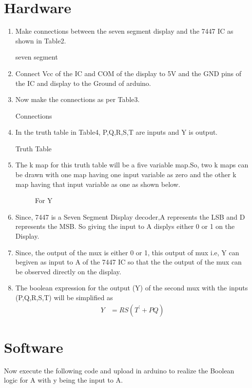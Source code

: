\documentclass[journal,twocolumn,10pt, a4paper]{article}
\begin{document}
\section{Hardware}
\begin{enumerate}
\item Make connections between the seven segment display and the 7447 IC as shown in Table2.

\begin{table}[!h]                          
\centering                                 
                
\caption{seven segment}                   
\label{table:Seven Segment}               
\end{table}

\item Connect Vcc of the IC and COM of the display to 5V and the GND pins of the IC and display to the Ground of arduino.


\item Now make the connections as per Table3.
\begin{table}[!h]                          
\centering                               
                 
\caption{Connections}                       
\label{table:Connections}                   
\end{table}
	
\item In the truth table in Table4, P,Q,R,S,T are inputs and Y is output.
\begin{table}[!h]                           
\centering                                  
                  
\caption{Truth Table}                    
\label{table:Truth Table}                 
\end{table}

\item The k map for this truth table will be a five variable map.So, two k maps can be drawn with one map having one input variable as zero and the other k map having that input variable as one as shown below.

\begin{figure}[!h]
\begin{center}
\resizebox{0.85\columnwidth}{!}{

}
\caption{For Y}
\label{fig:For Y}
\end{center}
\end{figure}

\item Since, 7447 is a Seven Segment Display decoder,A represents the LSB and D represents the MSB. So giving the input to A displys either 0 or 1 on the Display.
\item Since, the output of the mux is either 0 or 1, this output of mux i.e, Y can begiven as input to A of the 7447 IC so that the the output of the mux can be observed directly on the display.
\item The boolean expression for the output (Y) of the second mux with the inputs (P,Q,R,S,T) will be simplified as
\begin{align}
Y &= RS(T^\prime+PQ)
\end{align}
\end{enumerate}

\section{Software}
Now execute the following code and upload in arduino to realize the Boolean logic for A with y being the input to A.\\

\end{document}
